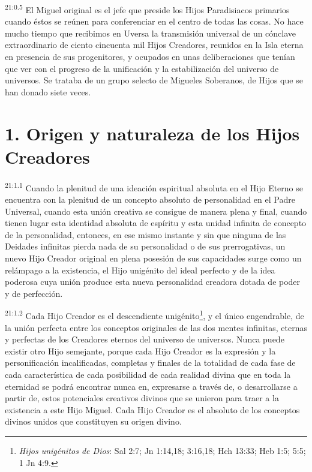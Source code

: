 \par
\textsuperscript{21:0.5} El Miguel original es el jefe que preside los Hijos Paradisiacos primarios cuando éstos se reúnen para conferenciar en el centro de todas las cosas. No hace mucho tiempo que recibimos en Uversa la transmisión universal de un cónclave extraordinario de ciento cincuenta mil Hijos Creadores, reunidos en la Isla eterna en presencia de sus progenitores, y ocupados en unas deliberaciones que tenían que ver con el progreso de la unificación y la estabilización del universo de universos. Se trataba de un grupo selecto de Migueles Soberanos, de Hijos que se han donado siete veces.

\section*{1. Origen y naturaleza de los Hijos Creadores}
\par
\textsuperscript{21:1.1} Cuando la plenitud de una ideación espiritual absoluta en el Hijo Eterno se encuentra con la plenitud de un concepto absoluto de personalidad en el Padre Universal, cuando esta unión creativa se consigue de manera plena y final, cuando tienen lugar esta identidad absoluta de espíritu y esta unidad infinita de concepto de la personalidad, entonces, en ese mismo instante y sin que ninguna de las Deidades infinitas pierda nada de su personalidad o de sus prerrogativas, un nuevo Hijo Creador original en plena posesión de sus capacidades surge como un relámpago a la existencia, el Hijo unigénito del ideal perfecto y de la idea poderosa cuya unión produce esta nueva personalidad creadora dotada de poder y de perfección.

\par
\textsuperscript{21:1.2} Cada Hijo Creador es el descendiente unigénito\footnote{\textit{Hijos unigénitos de Dios}: Sal 2:7; Jn 1:14,18; 3:16,18; Hch 13:33; Heb 1:5; 5:5; 1 Jn 4:9.}, y el único engendrable, de la unión perfecta entre los conceptos originales de las dos mentes infinitas, eternas y perfectas de los Creadores eternos del universo de universos. Nunca puede existir otro Hijo semejante, porque cada Hijo Creador es la expresión y la personificación incalificadas, completas y finales de la totalidad de cada fase de cada característica de cada posibilidad de cada realidad divina que en toda la eternidad se podrá encontrar nunca en, expresarse a través de, o desarrollarse a partir de, estos potenciales creativos divinos que se unieron para traer a la existencia a este Hijo Miguel. Cada Hijo Creador es el absoluto de los conceptos divinos unidos que constituyen su origen divino.

